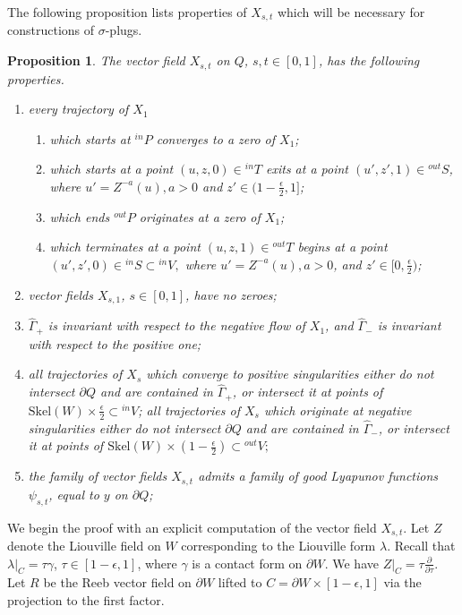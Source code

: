 \documentclass[12pt]{amsart}
\theoremstyle{plain}
\newtheorem{prop}[theorem]{Proposition}
\theoremstyle{definition}
\theoremstyle{remark}
\newcommand{\eps}{\epsilon}
\newcommand{\p}{\partial}
\newcommand{\wh}{\widehat}
\newcommand{\Skel}{\mathrm{Skel}}
\begin{document}
 
  
 
 
  

The following proposition lists  properties of $X_{s,t}$ which will be  necessary for  constructions of $\sigma$-plugs. 
\begin{prop}\label{prop:prelim-plug}
 The vector field   $X_{s,t}$ on $Q$, $s,t \in[0,1] $, has the following properties.  
\begin{enumerate}
 
\item  every trajectory of $X_{1}$
\begin{enumerate}
\item  which starts  at
 ${}^{in}P  $ converges to a zero of $X_{1}$;

 \item  which starts  at a point $(u,z,0) \in {}^{in}T$    exits   at a point $(u',z',1)\in {}^{out}S   $,   where  $u'=Z^{-a}(u) , a>0$  and  $z'\in(1-\frac\eps2,1]$;  
\item   which ends 
 ${}^{out}P $ originates at a zero of $X_{1}$;
 \item which terminates  at a point $(u,z,1) \in {}^{out}T $ begins at   a point $(u',z',0)  \in {}^{in}S \subset {}^{in}V, $  where  $u'=Z^{-a}(u) , a>0$, and  $z'\in[0,\frac\eps2)$;  
\end{enumerate}
 
\item  vector fields $X_{s,1}$, $s\in[0,1] $, have no zeroes;
\item $\wh\Gamma_+$ is invariant with respect to the negative flow of $X_1$, and $\wh\Gamma_-$ is invariant with respect to the positive one;
\item all trajectories of $X_s$ which converge to positive singularities either do not intersect $\p Q$ and are contained in $\wh\Gamma_+$, or intersect it at points of $\Skel(W)\times\frac\eps2\subset {}^{in}V$; all trajectories of $X_s$ which originate at negative singularities either do not intersect $\p Q$ and are contained in $\wh \Gamma_-$, or intersect it at points of $\Skel(W)\times(1-\frac{\eps}2)\subset {}^{out}V;$
\item  the  family of vector fields $X_{s,t}$ admits a family of good Lyapunov functions $ \psi_{s,t}$, equal to $y$ on $\p Q$;
\end{enumerate}
\end{prop}  
 We begin the proof with an explicit computation of the vector field $X_{s,t}$.  Let $Z$ denote the Liouville field on $W$ corresponding to the Liouville form $\lambda$. Recall that $\lambda|_C=\tau\gamma$, $\tau\in[1-\eps,1]$, where $\gamma$ is a contact form on $\p W$. We have $Z|_C=\tau\frac{\p}{\p\tau}.$ 
 Let $R$ be the Reeb vector field on $\p W$ lifted to $C=\p W\times[1-\eps,1]$ via the projection to the first factor.
 
\end{document}
